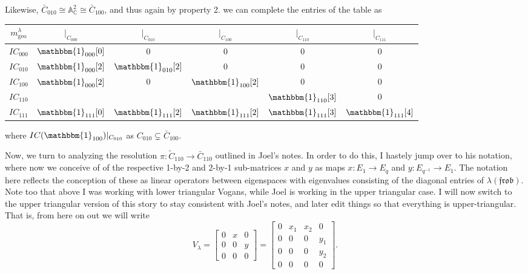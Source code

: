 \documentclass{memoir}
\newcommand{\mf}{\mathfrak}
\newcommand{\ba}{\mathbb{A}}
\newcommand{\bc}{\mathbb{C}}
\newcommand{\tx}{\text}
\theoremstyle{definition}
\begin{document}
	Likewise, $\bar{C}_{010}\cong \ba_{\bc}^2\cong\bar{C}_{100}$, and thus again by property 2. we can complete the entries of the table as 
	\begin{center}
	\begin{tabular}{ c | c c c c c}
		$m_{\tx{geo}}^\lambda$ & $|_{C_{000}}$ & $|_{C_{010}}$ & $|_{C_{100}}$ & $|_{C_{110}}$ & $|_{C_{111}}$ \\
		\hline 
		$IC_{000}$ & $\mathbbm{1}_{000}[0]$ & 0 & 0 & 0 & 0\\
		$IC_{010}$ & $\mathbbm{1}_{000}[2]$ & $\mathbbm{1}_{010}[2]$ & 0 & 0 & 0 \\
		$IC_{100}$ & $\mathbbm{1}_{000}[2]$ & 0 & $\mathbbm{1}_{100}[2]$ & 0 & 0 \\
		$IC_{110}$ &  &  &  & $\mathbbm{1}_{110}[3]$ & 0 \\
		$IC_{111}$ & $\mathbbm{1}_{111}[0]$ & $\mathbbm{1}_{111}[2]$ & $\mathbbm{1}_{111}[2]$ & $\mathbbm{1}_{111}[3]$ & $\mathbbm{1}_{111}[4]$ \\
	\end{tabular}
\end{center}
%
	where $IC(\mathbbm{1}_{100})|_{C_{010}}$ as $C_{010}\subsetneq \bar{C}_{100}$.  
	
	Now, we turn to analyzing the resolution $\pi:\tilde{C}_{110}\to \bar{C}_{110}$ outlined in Joel's notes.  
	In order to do this, I hastely jump over to his notation, where now we conceive of of the respective 1-by-2 and 2-by-1 sub-matrices $x$ and $y$ as maps $x:E_1\to E_q$ and $y:E_{q^{-1}}\to E_1$.  
	The notation here reflects the conception of these as linear operators between eigenspaces with eigenvalues consisting of the diagonal entries of $\lambda(\mf{frob})$.  
	Note too that above I was working with lower triangular Vogans, while Joel is working in the upper triangular case. 
	I will now switch to the upper triangular version of this story to stay consistent with Joel's notes, and later edit things so that everything is upper-triangular.   
	That is, from here on out we will write
	$$V_\lambda=\begin{bmatrix}
		0 & x & 0 \\
		0 & 0 & y\\
		0 & 0 & 0
	\end{bmatrix}=\begin{bmatrix}
	0 & x_1 & x_2 & 0 \\
	0 & 0 & 0 & y_1 \\
	0 & 0 & 0 & y_2 \\
	0 & 0 & 0 & 0
\end{bmatrix}.$$
\end{document}
